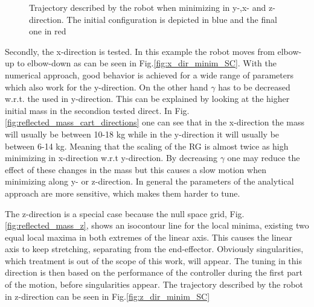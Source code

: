 \begin{figure}[htp!]
	\centering	
	 	 	
	\caption{Trajectory described by the robot when minimizing in y-,x- and z-direction. The initial configuration is depicted in blue and the final one in red}
	\label{fig:dir_minim_SC}
\end{figure}
%
%
Secondly, the x-direction is tested. In this example the robot moves from elbow-up to elbow-down as can be seen in Fig.\ref{fig:x_dir_minim_SC}.  With the numerical approach, good behavior is achieved for a wide range of parameters which also work for the y-direction. On the other hand $\gamma$ has to be decreased w.r.t. the used in y-direction. This can be explained by looking at the higher initial mass in the secondion tested direct. In Fig.\ref{fig:reflected_mass_cart_directions}  one can see that in the x-direction the mass will usually be between 10-18 kg while in the y-direction it will usually be between 6-14 kg. Meaning that the scaling of the RG is almost twice as high minimizing in x-direction w.r.t y-direction.  By decreasing $\gamma$ one may reduce the effect of these changes in the mass but this causes a slow motion when minimizing along y- or z-direction.
In general the parameters of the analytical approach are more sensitive, which makes them harder to tune.

The z-direction is a special case because the null space grid, Fig.\ref{fig:reflected_mass_z}, shows an isocontour line for the local minima, existing two equal local maxima in both extremes of the linear axis. This causes the linear axis to keep stretching,  separating from the end-effector. Obviously singularities, which treatment is out of the scope of this work, will appear. The tuning in this direction is then based on the performance of the controller during the first part of the motion, before singularities appear. %
The trajectory described by the robot in z-direction can be seen in Fig.\ref{fig:z_dir_minim_SC}




